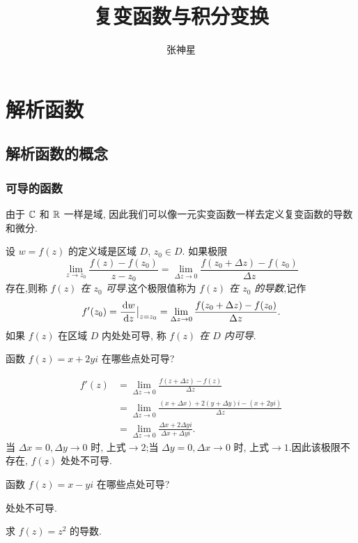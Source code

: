 \documentclass[nocolor,theme=doremi,lang=cn,11pt,chinese,twoside,openright,usesamecnt]{elegantbook}
\begin{document}
\author{张神星}
\title{复变函数与积分变换}
\maketitle

\chapter{解析函数}
\section{解析函数的概念}

\subsection{可导的函数}

由于 ${\mathbb{C}}$ 和 ${\mathbb{R}}$ 一样是域, 因此我们可以像一元实变函数一样去定义复变函数的导数和微分.

\begin{definition}
	设 $w=f(z)$ 的定义域是区域 $D$, $z_0\in D$.
	如果极限
		\[\lim_{z\to z_0}\frac{f(z)-f(z_0)}{z-z_0}
		=\lim_{\Delta z\to 0}\frac{f(z_0+\Delta z)-f(z_0)}{\Delta z}\]
	存在,则称 \emph{$f(z)$ 在 $z_0$ 可导}.这个极限值称为 \emph{$f(z)$ 在 $z_0$ 的导数},记作
		\[f'(z_0)=\frac{\,\mathrm{d} w}{\,\mathrm{d} z}\big|_{z=z_0}
		=\lim_{\Delta z\to 0}\frac{f(z_0+\Delta z)-f(z_0)}{\Delta z}.\]
	如果 $f(z)$ 在区域 $D$ 内处处可导, 称 \emph{$f(z)$ 在 $D$ 内可导}.
\end{definition}

\begin{example}
	函数 $f(z)=x+2yi$ 在哪些点处可导?
\end{example}

\begin{solution}
	\begin{align*}
		f'(z)&=\lim_{\Delta z\to 0}\frac{f(z+\Delta z)-f(z)}{\Delta z}\\
		&{=\lim_{\Delta z\to 0}\frac{(x+\Delta x)+2(y+\Delta y)i-(x+2yi)}{\Delta z}}\\
		&{=\lim_{\Delta z\to 0}\frac{\Delta x+2\Delta y i}{\Delta x+\Delta yi}.}
	\end{align*}
	{当 $\Delta x=0, \Delta y\to 0$ 时, 上式$\to2$;当 $\Delta y=0, \Delta x\to 0$ 时, 上式$\to1$.因此该极限不存在, $f(z)$ 处处不可导.}
\end{solution}

	\begin{exercise}
		函数 $f(z)=x-yi$ 在哪些点处可导? 
	\end{exercise}
	\begin{answer}
		处处不可导.
	\end{answer}
\begin{example}
	求 $f(z)=z^2$ 的导数.
\end{example}
\end{document}
